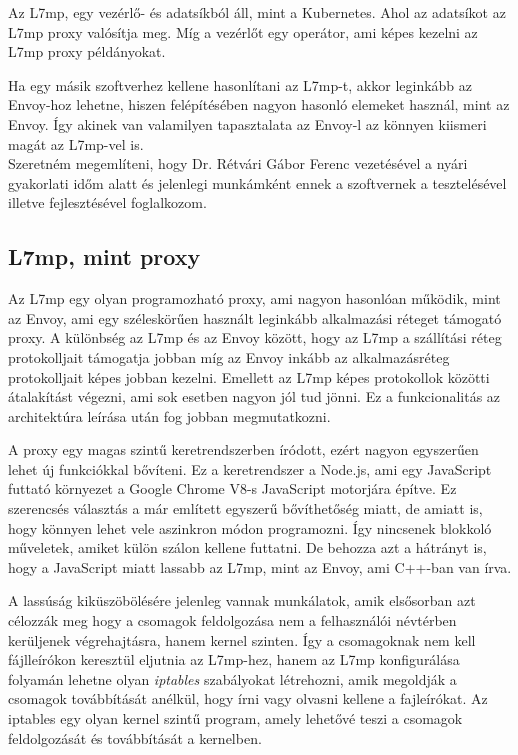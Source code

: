 Az L7mp, egy vezérlő- és adatsíkból áll, mint a Kubernetes. Ahol az adatsíkot 
az L7mp proxy valósítja meg. Míg a vezérlőt egy operátor, ami képes kezelni 
az L7mp proxy példányokat. 

Ha egy másik szoftverhez kellene hasonlítani az L7mp-t, akkor leginkább az 
Envoy-hoz lehetne, hiszen felépítésében nagyon hasonló elemeket használ, mint
az Envoy. Így akinek van valamilyen tapasztalata az Envoy-l az könnyen kiismeri
magát az L7mp-vel is.  \\

Szeretném megemlíteni, hogy Dr. Rétvári Gábor Ferenc vezetésével a nyári
gyakorlati időm alatt és jelenlegi munkámként ennek a szoftvernek a tesztelésével 
illetve fejlesztésével foglalkozom. 

\subsection{L7mp, mint proxy}

Az L7mp egy olyan programozható proxy, ami nagyon hasonlóan működik, mint az Envoy, ami 
egy széleskörűen használt leginkább alkalmazási réteget támogató proxy. A különbség
az L7mp és az Envoy között, hogy az L7mp a szállítási réteg protokolljait 
támogatja jobban míg az Envoy inkább az alkalmazásréteg protokolljait képes jobban kezelni.
Emellett az L7mp képes protokollok közötti átalakítást végezni, ami sok esetben nagyon
jól tud jönni. Ez a funkcionalitás az architektúra leírása után fog jobban 
megmutatkozni.

A proxy egy magas szintű keretrendszerben íródott, ezért nagyon egyszerűen 
lehet új funkciókkal bővíteni. Ez a keretrendszer a Node.js, ami egy JavaScript
futtató környezet a Google Chrome V8-s JavaScript motorjára építve. Ez szerencsés 
választás a már említett egyszerű bővíthetőség miatt, de  amiatt is, hogy
könnyen lehet vele aszinkron módon programozni. Így nincsenek blokkoló műveletek,
amiket külön szálon kellene futtatni. De behozza azt a hátrányt is, hogy a 
JavaScript miatt lassabb az L7mp, mint az Envoy, ami C++-ban van írva. 

A lassúság kiküszöbölésére jelenleg vannak munkálatok, amik elsősorban azt 
célozzák meg hogy a csomagok feldolgozása nem a felhasználói névtérben kerüljenek
végrehajtásra, hanem kernel szinten. Így a csomagoknak nem kell fájlleírókon 
keresztül eljutnia az L7mp-hez, hanem az L7mp konfigurálása folyamán lehetne
olyan \textit{iptables} szabályokat létrehozni, amik megoldják a csomagok továbbítását
anélkül, hogy írni vagy olvasni kellene a fajleírókat. Az iptables egy olyan 
kernel szintű program, amely lehetővé teszi a csomagok feldolgozását és továbbítását
a kernelben. \\

